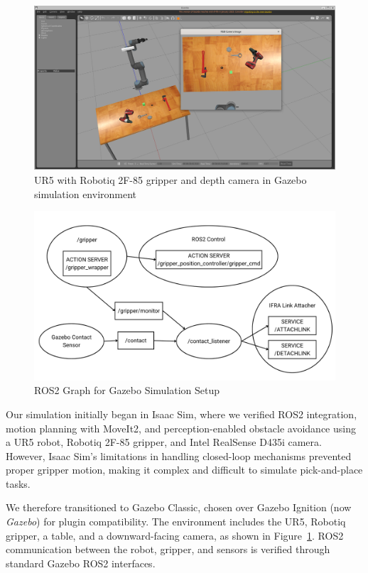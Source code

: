 \documentclass[12pt]{extarticle}
\begin{document}
\begin{figure}[h]
    \centering
    \includegraphics[width=\linewidth]{images/gazebo_setup.png}
    \caption{UR5 with Robotiq 2F-85 gripper and depth camera in Gazebo simulation environment}
    \label{fig: gazebo-setup}
\end{figure}

\begin{figure}[h]
    \centering
    \includegraphics[width=\linewidth]{images/ros2_sim_graph.png}
    \caption{ROS2 Graph for Gazebo Simulation Setup}
    \label{fig: ros2-sim-graph}
\end{figure}

Our simulation initially began in Isaac Sim, where we verified ROS2 integration, motion planning with MoveIt2, and perception-enabled obstacle avoidance using a UR5 robot, Robotiq 2F-85 gripper, and Intel RealSense D435i camera. However, Isaac Sim’s limitations in handling closed-loop mechanisms prevented proper gripper motion, making it complex and difficult to simulate pick-and-place tasks.

We therefore transitioned to Gazebo Classic, chosen over Gazebo Ignition (now \textit{Gazebo}) for plugin compatibility. The environment includes the UR5, Robotiq gripper, a table, and a downward-facing camera, as shown in Figure~\ref{fig: gazebo-setup}. ROS2 communication between the robot, gripper, and sensors is verified through standard Gazebo ROS2 interfaces.
\end{document}
